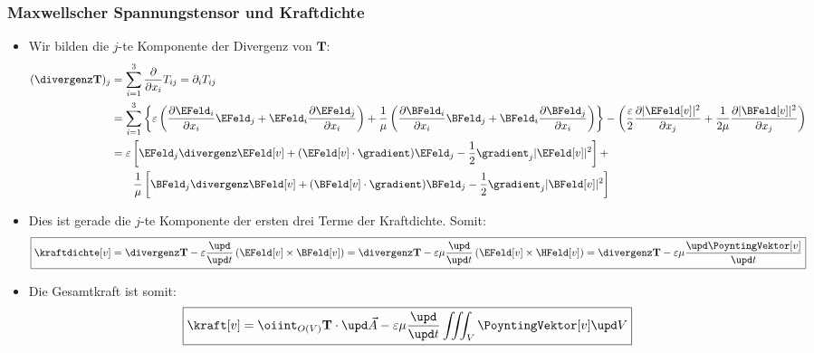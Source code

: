 \begin{frame}
  \frametitle{Maxwellscher Spannungstensor und Kraftdichte}
  \begin{itemize}[<+->]
  \item Wir bilden die \(j\)-te Komponente der Divergenz von \(\mathbf{T}\):
    \begin{align*}
      (\divergenz\mathbf{T})_j &= \sum_{i=1}^3 \frac{\partial}{\partial x_i} T_{ij} = \partial_i T_{ij} \\
                              &= \sum_{i=1}^3 \left\{ \varepsilon\left( \frac{\partial \EFeld_i}{\partial x_i} \EFeld_j + \EFeld_i\frac{\partial \EFeld_j}{\partial x_i} \right) +
\frac{1}{\mu}\left( \frac{\partial \BFeld_i}{\partial x_i} \BFeld_j + \BFeld_i\frac{\partial \BFeld_j}{\partial x_i} \right)
                                \right\} - \left(\frac{\varepsilon}{2}\frac{\partial |\EFeld[v]|^2}{\partial x_j} + \frac{1}{2\mu}\frac{\partial |\BFeld[v]|^2}{\partial x_j}\right)\\
                              &=\varepsilon\left[\EFeld_j \divergenz\EFeld[v] + (\EFeld[v]\cdot\gradient )\EFeld_j - \frac{1}{2}\gradient_j |\EFeld[v]|^2 \right] +\\
                               &\qquad \frac{1}{\mu}\left[\BFeld_j \divergenz\BFeld[v] + (\BFeld[v]\cdot\gradient )\BFeld_j - \frac{1}{2}\gradient_j |\BFeld[v]|^2 \right]
    \end{align*}
  \item Dies ist gerade die \(j\)-te Komponente der ersten drei Terme der Kraftdichte. Somit:
    \begin{equation*}
      \boxed{\kraftdichte[v] = \divergenz \mathbf{T} - \varepsilon\frac{\upd}{\upd t}\left( \EFeld[v] \times \BFeld[v]\right) 
                   = \divergenz \mathbf{T} - \varepsilon\mu\frac{\upd}{\upd t}\left( \EFeld[v] \times \HFeld[v]\right) 
      = \divergenz \mathbf{T} - \varepsilon\mu\frac{\upd \PoyntingVektor[v]}{\upd t}}
  \end{equation*}
\item Die Gesamtkraft ist somit:
  \begin{equation*}
  \boxed{\kraft[v] = \oiint_{O(V)} \mathbf{T} \cdot \upd\vec{A} - \varepsilon\mu\frac{\upd}{\upd t} \iiint_V \PoyntingVektor[v] \upd V}
\end{equation*}
\end{itemize}
\end{frame}

